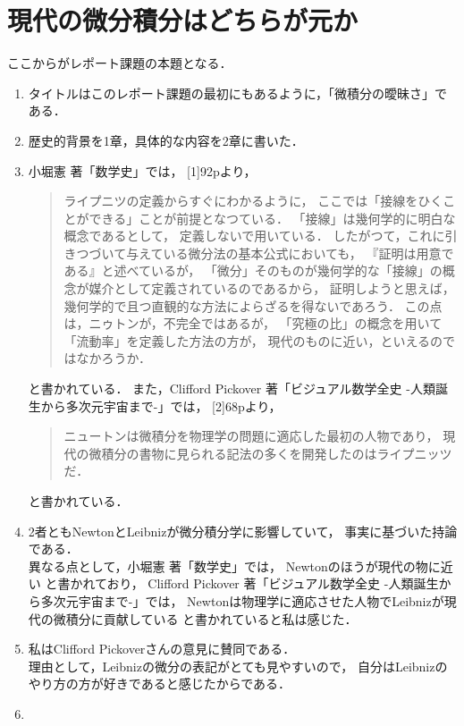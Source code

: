 \documentclass[11pt, a4paper]{jarticle}
\theoremstyle{definition}
\begin{document}
	\section{現代の微分積分はどちらが元か}
		ここからがレポート課題の本題となる．
		\begin{enumerate}
			\item {
				タイトルはこのレポート課題の最初にもあるように，「微積分の曖昧さ」である．
			}
			\item {
				歴史的背景を1章，具体的な内容を2章に書いた．
			}
			\item {
				小堀憲 著「数学史」では，
				[1]92pより，
				\begin{quotation}
					ライプニツの定義からすぐにわかるように，
					ここでは「接線をひくことができる」ことが前提となつている．
					「接線」は幾何学的に明白な概念であるとして，
					定義しないで用いている．
					したがつて，これに引きつづいて与えている微分法の基本公式においても，
					『証明は用意である』と述べているが，
					「微分」そのものが幾何学的な「接線」の概念が媒介として定義されているのであるから，
					証明しようと思えば，
					幾何学的で且つ直観的な方法によらざるを得ないであろう．
					この点は，ニゥトンが，不完全ではあるが，
					「究極の比」の概念を用いて「流動率」を定義した方法の方が，
					現代のものに近い，といえるのではなかろうか．
				\end{quotation}
				と書かれている．
				また，Clifford Pickover 著「ビジュアル数学全史 -人類誕生から多次元宇宙まで-」では，
				[2]68pより，
				\begin{quotation}
					ニュートンは微積分を物理学の問題に適応した最初の人物であり，
					現代の微積分の書物に見られる記法の多くを開発したのはライプニッツだ．
				\end{quotation}
				と書かれている．
			}
			\item {
				2者ともNewtonとLeibnizが微分積分学に影響していて，
				事実に基づいた持論である． \\
				異なる点として，小堀憲 著「数学史」では，
				Newtonのほうが現代の物に近い
				と書かれており，
				Clifford Pickover 著「ビジュアル数学全史 -人類誕生から多次元宇宙まで-」では，
				Newtonは物理学に適応させた人物でLeibnizが現代の微積分に貢献している
				と書かれていると私は感じた．
			}
			\item {
				私はClifford Pickoverさんの意見に賛同である．\\
				理由として，Leibnizの微分の表記がとても見やすいので，
				自分はLeibnizのやり方の方が好きであると感じたからである．
			}
			\item {
}
\end{enumerate}
\end{document}

